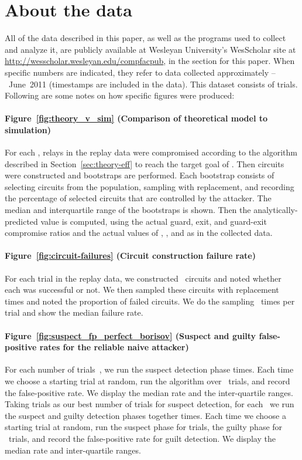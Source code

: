 \documentclass[]{lmcs}
\begin{document}
\appendix

\section{About the data}
\label{sec:about_data}

All of the data described 
in this paper, as well as the programs used to collect
and analyze it, are publicly available at Wesleyan University's
WesScholar site at
\url{http://wesscholar.wesleyan.edu/compfacpub}, in the section for
this paper.
When specific numbers
are indicated, they refer to data collected approximately --~June~2011
(timestamps are included in the data).
This dataset consists of  trials.
Following are some notes on
how specific figures were produced:

\paragraph*{Figure~\ref{fig:theory_v_sim} (Comparison of theoretical model
to simulation)}
For each , relays in the replay data were
compromised according to the algorithm described in
Section~\ref{sec:theory-eff} to reach the target goal of .
Then  circuits were constructed and  bootstraps are
performed.  Each bootstrap consists of selecting  circuits
from the population, sampling with replacement, and recording the 
percentage of selected circuits that are controlled by the attacker.
The median and interquartile range of the  bootstraps is shown.
Then the analytically-predicted value is computed, using the actual
guard, exit, and guard-exit compromise ratios and the actual values of
, , and  as in the collected data.

\paragraph*{Figure~\ref{fig:circuit-failures} (Circuit construction
failure rate)}
For each trial in
the replay data, we constructed~ circuits and noted whether each
was successful or not.  We then sampled these circuits with
replacement  times and noted the proportion of failed circuits.
We do the sampling~ times per trial and show the median
failure rate.

\paragraph*{Figure~\ref{fig:suspect_fp_perfect_borisov} (Suspect and
guilty false-positive rates for the reliable naive attacker)}
For each number of trials~, we run the suspect detection phase 
times.  Each time we choose a starting trial at random, run the algorithm
over~ trials, and record the false-positive rate.  We display the median
rate and the inter-quartile ranges.  Taking  trials as our best
number of trials for suspect detection, for each~ we run the suspect
and guilty detection phases together  times.  Each time we choose a
starting trial at random, run the suspect phase for  trials, the guilty
phase for ~trials, and record the false-positive rate for guilt detection.
We display the median rate and inter-quartile ranges.
\end{document}
